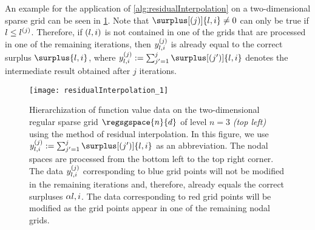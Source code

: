 An example for the application of \cref{alg:residualInterpolation}
on a two-dimensional sparse grid can be seen in
\cref{fig:residualInterpolation}.
Note that
$\surplus[(j)]{\*l,\*i} \not= 0$ can only be true if $\*l \le \*l^{(j)}$.
Therefore, if $(\*l, \*i)$ is not contained in one of the
grids that are processed in one of the remaining iterations,
then $\linout[(j)]{\*l,\*i}$ is already equal to the correct surplus
$\surplus{\*l,\*i}$,
where $\linout[(j)]{\*l,\*i} := \sum_{j'=1}^j \surplus[(j')]{\*l,\*i}$
denotes the intermediate result obtained after $j$ iterations.

\begin{SCfigure}
  \texttt{[image: residualInterpolation\_1]}%
  \caption[%
    Hierarchization with residual interpolation%
  ]{%
    Hierarchization of function value data on the
    two-dimensional regular sparse grid
    $\regsgspace{n}{d}$ of level $n = 3$ \emph{(top left)}
    using the method of residual interpolation.
    In this figure, we use
    $\linout[(j)]{\*l,\*i} := \sum_{j'=1}^j \surplus[(j')]{\*l,\*i}$
    as an abbreviation.
    The nodal spaces are processed from the bottom left to
    the top right corner.
    The data $\linout[(j)]{\*l,\*i}$
    corresponding to \textcolor{C0}{blue grid points}
    will not be modified in the remaining iterations
    and, therefore, already equals the correct surpluses $\alpha{\*l,\*i}$.
    The data corresponding to \textcolor{C1}{red grid points}
    will be modified as the grid points appear in one of the remaining
    nodal grids.%
  }%
  \label{fig:residualInterpolation}%
\end{SCfigure}
